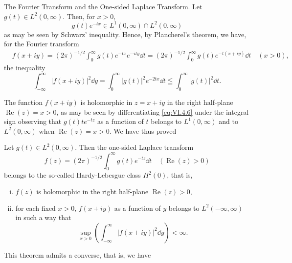 The Fourier Transform and the One-sided Laplace Transform. Let $g(t) \in L^2(0, \infty)$. Then, for $x > 0$, 
\[
g (t) e ^{-tx} \in L ^{1} (0, \infty) \cap L ^{2} (0, \infty)
\]
as may be seen by Schwarz' inequality. Hence, by Plancherel's theorem, we have, for the Fourier transform 
\begin{equation}\label{eq:VI.4.6}
\begin{aligned}
&f (x + i y)  = (2 \pi) ^{-1/2} \int_{0} ^{\infty} g (t) e ^{-tx} e ^{-ity} \dd t = (2 \pi) ^{-1/2} \int_{0} ^{\infty} g (t) e ^{-t(x+iy)} \dd t \quad (x > 0),
\end{aligned}
\end{equation}
the inequality 
\begin{equation}\label{eq:VI.4.7}
\int_{- \infty} ^{\infty} | f (x + i y) | ^{2} \dd y = \int_{0} ^{\infty} | g (t) | ^{2} e ^{-2tx} \dd t \leqq \int_{0} ^{\infty} | g (t) | ^{2} \dd t.
\end{equation}

The function $f(x + iy)$ is holomorphic in $z = x + iy$ in the right half-plane $\operatorname{Re}(z) = x > 0$, as may be seen by differentiating \eqref{eq:VI.4.6} under the integral sign observing that $g(t) te^{-tz}$ as a function of $t$ belongs to $L^{1}(0, \infty)$ and to $L^{2}(0, \infty)$ when $\operatorname{Re}(z) = x > 0$. We have thus proved 

\begin{theorem}\label{thm:VI.4.Theorem.1} Let $g(t) \in L^2(0, \infty)$. Then the one-sided Laplace transform 
\begin{equation}\tag{6'}\label{eq:VI.4.6'}
f (z) = (2 \pi) ^{-1/2} \int_{0} ^{\infty} g (t) e ^{-tz} \dd t \quad (\operatorname{Re} (z) > 0)
\end{equation}
belongs to the so-called Hardy-Lebesgue class $H^2(0)$, that is, \begin{enumerate}[(i)]
\item $f(z)$ is holomorphic in the right half-plane $\operatorname{Re}(z) > 0$,
\item for each fixed $x > 0$, $f(x + iy)$ as a function of $y$ belongs to $L^2(-\infty, \infty)$ in such a way that
\begin{equation}\tag{7'}\label{eq:VI.4.7'}
\sup\limits _{x>0} \left(\int_{- \infty} ^{\infty} | f (x + i y) | ^{2} \dd y\right) < \infty .
\end{equation}
\end{enumerate}
\end{theorem}

This theorem admits a converse, that is, we have 

